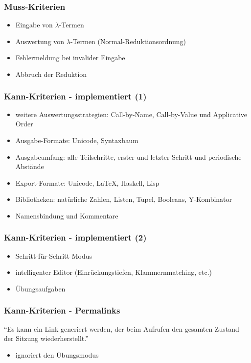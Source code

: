 \documentclass[10pt]{beamer}
\begin{document}
\begin{frame}[plain]
\frametitle{Muss-Kriterien}
\begin{itemize}
\item Eingabe von $\lambda$-Termen
\item Auswertung von $\lambda$-Termen (Normal-Reduktionsordnung)
\item Fehlermeldung bei invalider Eingabe
\item Abbruch der Reduktion
\end{itemize}
\end{frame}

\begin{frame}[plain]
\frametitle{Kann-Kriterien - implementiert (1)}
\begin{itemize}
\item weitere Auswertungsstrategien: Call-by-Name, Call-by-Value und Applicative Order
\item Ausgabe-Formate: Unicode, Syntaxbaum
\item Ausgabeumfang: alle Teilschritte, erster und letzter Schritt und periodische Abstände
\item Export-Formate: Unicode, \LaTeX, Haskell, Lisp
\item Bibliotheken: natürliche Zahlen, Listen, Tupel, Booleans, Y-Kombinator
\item Namensbindung und Kommentare
\end{itemize}
\end{frame}


\begin{frame}[plain]
\frametitle{Kann-Kriterien - implementiert (2)}
\begin{itemize}
\item Schritt-für-Schritt Modus
\item intelligenter Editor (Einrückungstiefen, Klammernmatching, etc.)
\item Übungsaufgaben
\end{itemize}
\end{frame}

\begin{frame}[plain]
\frametitle{Kann-Kriterien - \alert{Permalinks}}
\enquote{Es kann ein Link generiert werden, der beim Aufrufen den gesamten Zustand
der Sitzung wiederherstellt.}
\begin{itemize}
\item ignoriert den Übungsmodus
\end{itemize}
\end{frame}
\end{document}
